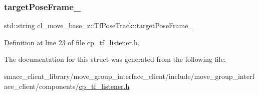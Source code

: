 \subsubsection{\texorpdfstring{target\+Pose\+Frame\+\_\+}{targetPoseFrame\_}}
{\footnotesize\ttfamily std\+::string cl\+\_\+move\+\_\+base\+\_\+z\+::\+Tf\+Pose\+Track\+::target\+Pose\+Frame\+\_\+}



Definition at line 23 of file cp\+\_\+tf\+\_\+listener.\+h.



The documentation for this struct was generated from the following file\+:\begin{DoxyCompactItemize}
\item 
smacc\+\_\+client\+\_\+library/move\+\_\+group\+\_\+interface\+\_\+client/include/move\+\_\+group\+\_\+interface\+\_\+client/components/\hyperlink{cp__tf__listener_8h}{cp\+\_\+tf\+\_\+listener.\+h}\end{DoxyCompactItemize}
